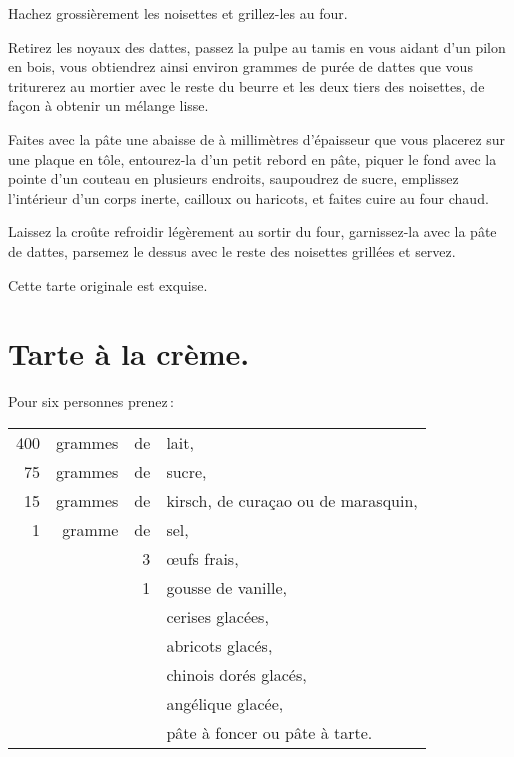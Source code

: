 Hachez grossièrement les noisettes et grillez-les au four.

Retirez les noyaux des dattes, passez la pulpe au tamis en vous aidant d'un
pilon en bois, vous obtiendrez ainsi environ {\mmm} grammes de purée de
dattes que vous triturerez au mortier avec le reste du beurre et les deux tiers
des noisettes, de façon à obtenir un mélange lisse.

Faites avec la pâte une abaisse de {\mmm} à {\mmm} millimètres
d'épaisseur que vous placerez sur une plaque en tôle, entourez-la d'un petit
rebord en pâte, piquer le fond avec la pointe d'un couteau en plusieurs
endroits, saupoudrez de sucre, emplissez l'intérieur d'un corps inerte,
cailloux ou haricots, et faites cuire au four chaud.

Laissez la croûte refroidir légèrement au sortir du four, garnissez-la avec la
pâte de dattes, parsemez le dessus avec le reste des noisettes grillées et
servez.

Cette tarte originale est exquise.

\section*{\centering Tarte à la crème.}
{}

Pour six personnes prenez :

\footnotesize
\begin{longtable}{rrrp{16em}}
    400 & grammes & de & lait,                                                                            \\
     75 & grammes & de & sucre,                                                                           \\
     15 & grammes & de & kirsch, de curaçao ou de marasquin,                                              \\
      1 & gramme  & de & sel,                                                                             \\
        &         &  3 & œufs frais,                                                                      \\
        &         &  1 & gousse de vanille,                                                               \\
        &         &    & cerises glacées,                                                                 \\
        &         &    & abricots glacés,                                                                 \\
        &         &    & chinois dorés glacés,                                                            \\
        &         &    & angélique glacée,                                                                \\
        &         &    & pâte à foncer ou pâte à tarte.                                                   \\
\end{longtable}
\normalsize

